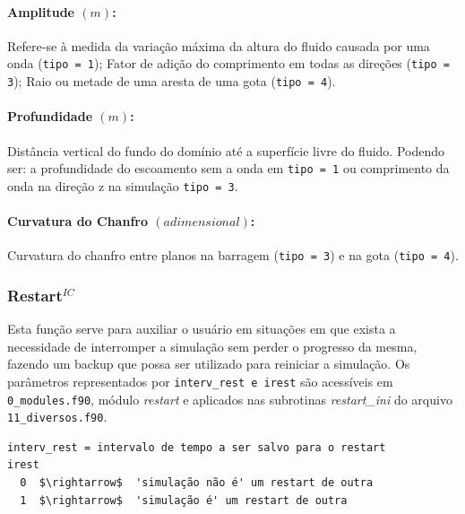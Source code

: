 \documentclass[12pt, a4paper]{article}
\begin{document}
\paragraph{Amplitude $(m)$:} Refere-se à medida da variação máxima da altura do fluido causada por uma onda (\verb|tipo = 1|); Fator de adição do comprimento em todas as direções (\verb|tipo = 3|); Raio ou metade de uma aresta de uma gota (\verb|tipo = 4|).
\paragraph{Profundidade $(m)$:} Distância vertical do fundo do domínio até a superfície livre do fluido. Podendo ser: a profundidade do escoamento sem a onda em \verb|tipo = 1| ou comprimento da onda na direção z na simulação \verb|tipo = 3|.
\paragraph{Curvatura do Chanfro $(adimensional)$:} Curvatura do chanfro entre planos na barragem (\verb|tipo = 3|) e na gota (\verb|tipo = 4|).


\subsubsection{Restart$^{IC}$}
Esta função serve para auxiliar o usuário em situações em que exista a necessidade de interromper a simulação sem perder o progresso da mesma, fazendo um backup que possa ser utilizado para reiniciar a simulação. Os parâmetros representados por \verb|interv_rest e irest| são acessíveis em \verb|0_modules.f90|, módulo \textit{restart} e aplicados nas subrotinas \textit{restart\_ini} do arquivo \verb|11_diversos.f90|.
\begin{lstlisting}[escapeinside='']
interv_rest = intervalo de tempo a ser salvo para o restart
irest	
  0  $\rightarrow$  'simulação não é' um restart de outra
  1  $\rightarrow$  'simulação é' um restart de outra
\end{lstlisting}

\end{document}
